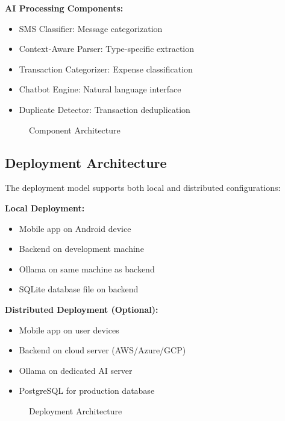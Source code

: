 \documentclass[11pt,a4paper]{report}
\begin{document}
\textbf{AI Processing Components:}
\begin{itemize}
    \item SMS Classifier: Message categorization
    \item Context-Aware Parser: Type-specific extraction
    \item Transaction Categorizer: Expense classification
    \item Chatbot Engine: Natural language interface
    \item Duplicate Detector: Transaction deduplication
\end{itemize}

\begin{figure}[htbp]
    \centering
    \caption{Component Architecture}
    \label{fig:components}
\end{figure}

\subsection{Deployment Architecture}

The deployment model supports both local and distributed configurations:

\textbf{Local Deployment:}
\begin{itemize}
    \item Mobile app on Android device
    \item Backend on development machine
    \item Ollama on same machine as backend
    \item SQLite database file on backend
\end{itemize}

\textbf{Distributed Deployment (Optional):}
\begin{itemize}
    \item Mobile app on user devices
    \item Backend on cloud server (AWS/Azure/GCP)
    \item Ollama on dedicated AI server
    \item PostgreSQL for production database
\end{itemize}

\begin{figure}[htbp]
    \centering
    \caption{Deployment Architecture}
    \label{fig:deployment}
\end{figure}
\end{document}
